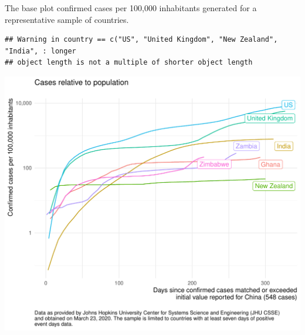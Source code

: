 \documentclass[]{article}
\newenvironment{Shaded}{\begin{snugshade}}{\end{snugshade}}
\newcommand{\CharTok}[1]{\textcolor[rgb]{0.31,0.60,0.02}{#1}}
\newcommand{\DataTypeTok}[1]{\textcolor[rgb]{0.13,0.29,0.53}{#1}}
\newcommand{\FloatTok}[1]{\textcolor[rgb]{0.00,0.00,0.81}{#1}}
\newcommand{\KeywordTok}[1]{\textcolor[rgb]{0.13,0.29,0.53}{\textbf{#1}}}
\newcommand{\NormalTok}[1]{#1}
\newcommand{\OperatorTok}[1]{\textcolor[rgb]{0.81,0.36,0.00}{\textbf{#1}}}
\newcommand{\StringTok}[1]{\textcolor[rgb]{0.31,0.60,0.02}{#1}}
\begin{document}
The base plot confirmed cases per 100,000 inhabitants generated for a
representative sample of countries.

\begin{Shaded}
\end{Shaded}

\begin{verbatim}
## Warning in country == c("US", "United Kingdom", "New Zealand", "India", : longer
## object length is not a multiple of shorter object length
\end{verbatim}

\includegraphics{Wuhan-Hu-1_files/figure-latex/filtered_plot-1.pdf}
\end{document}
